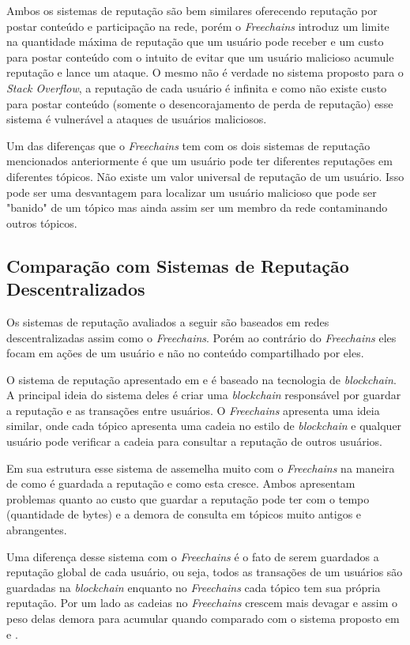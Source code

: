 \documentclass[12pt]{article}
\newcommand{\FC} {\emph{Freechains}\xspace}
\begin{document}
Ambos os sistemas de reputação são bem similares oferecendo reputação por postar conteúdo e participação na rede, porém o \FC introduz um limite na quantidade máxima de reputação que um usuário pode receber e um custo para postar conteúdo com o intuito de evitar que um usuário malicioso acumule reputação e lance um ataque. O mesmo não é verdade no sistema proposto para o \emph{Stack Overflow}, a reputação de cada usuário é infinita e como não existe custo para postar conteúdo (somente o desencorajamento de perda de reputação) esse sistema é vulnerável a ataques de usuários maliciosos.

Um das diferenças que o \FC tem com os dois sistemas de reputação mencionados anteriormente é que um usuário pode ter diferentes reputações em diferentes tópicos. Não existe um valor universal de reputação de um usuário. Isso pode ser uma desvantagem para localizar um usuário malicioso que pode ser "banido" de um tópico mas ainda assim ser um membro da rede contaminando outros tópicos.  

\subsection{Comparação com Sistemas de Reputação Descentralizados} \label{subsec:CompSRD}

Os sistemas de reputação avaliados a seguir são baseados em redes descentralizadas assim como o \FC. Porém ao contrário do \FC  eles focam em ações de um usuário e não no conteúdo compartilhado por eles.

O sistema de reputação apresentado em \cite{dennis2015rep} e \cite{dennis2016rep} é baseado na tecnologia de \emph{blockchain}. A principal ideia do sistema deles é criar uma \emph{blockchain} responsável por guardar a reputação e as transações entre usuários. O \FC apresenta uma ideia similar, onde cada tópico apresenta uma cadeia no estilo de \emph{blockchain} e qualquer usuário pode verificar a cadeia para consultar a reputação de outros usuários.

Em sua estrutura esse sistema de assemelha muito com o \FC na maneira de como é guardada a reputação e como esta cresce. Ambos apresentam problemas quanto ao custo que guardar a reputação pode ter com o tempo (quantidade de bytes) e a demora de consulta em tópicos muito antigos e abrangentes.

Uma diferença desse sistema com o \FC é o fato de serem guardados a reputação global de cada usuário, ou seja, todos as transações de um usuários são guardadas na \emph{blockchain} enquanto no \FC cada tópico tem sua própria reputação. Por um lado as cadeias no \FC crescem mais devagar e assim o peso delas demora para acumular quando comparado com o sistema proposto em \cite{dennis2015rep} e \cite{dennis2016rep}.
\end{document}
